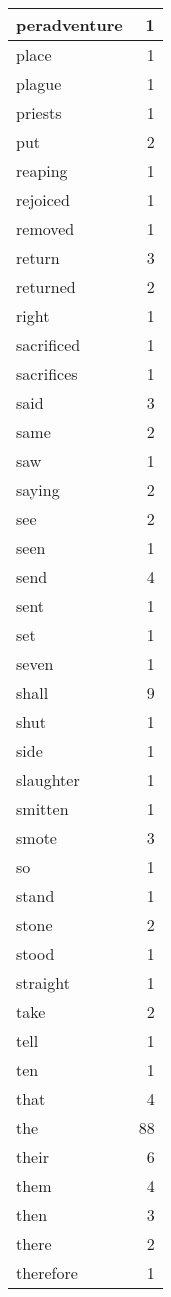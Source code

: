 \begin{center}
\begin{longtable}{l|r}
peradventure & 1 \\ \hline
place & 1 \\ \hline
plague & 1 \\ \hline
priests & 1 \\ \hline
put & 2 \\ \hline
reaping & 1 \\ \hline
rejoiced & 1 \\ \hline
removed & 1 \\ \hline
return & 3 \\ \hline
returned & 2 \\ \hline
right & 1 \\ \hline
sacrificed & 1 \\ \hline
sacrifices & 1 \\ \hline
said & 3 \\ \hline
same & 2 \\ \hline
saw & 1 \\ \hline
saying & 2 \\ \hline
see & 2 \\ \hline
seen & 1 \\ \hline
send & 4 \\ \hline
sent & 1 \\ \hline
set & 1 \\ \hline
seven & 1 \\ \hline
shall & 9 \\ \hline
shut & 1 \\ \hline
side & 1 \\ \hline
slaughter & 1 \\ \hline
smitten & 1 \\ \hline
smote & 3 \\ \hline
so & 1 \\ \hline
stand & 1 \\ \hline
stone & 2 \\ \hline
stood & 1 \\ \hline
straight & 1 \\ \hline
take & 2 \\ \hline
tell & 1 \\ \hline
ten & 1 \\ \hline
that & 4 \\ \hline
the & 88 \\ \hline
their & 6 \\ \hline
them & 4 \\ \hline
then & 3 \\ \hline
there & 2 \\ \hline
therefore & 1 \\ \hline

\end{longtable}
\end{center}
